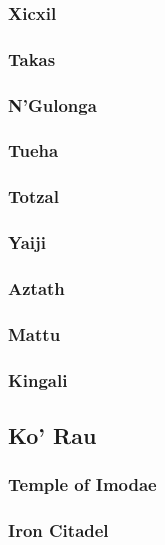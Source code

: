 		\subsubsection{Xicxil}
	
		\subsubsection{Takas}
	
		\subsubsection{N'Gulonga}
	
		\pagebreak

		\subsubsection{Tueha}

		\subsubsection{Totzal}

		\subsubsection{Yaiji}

		\subsubsection{Aztath}

		\subsubsection{Mattu}

		\subsubsection{Kingali}

	\subsection{Ko' Rau}

		\subsubsection{Temple of Imodae}

		\subsubsection{Iron Citadel}

